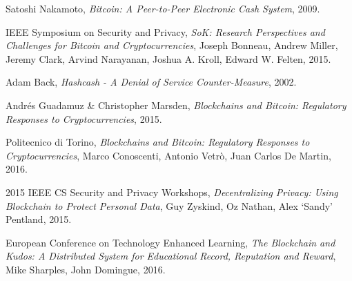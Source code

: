 %
%
%
\begin{thebibliography}{1}

  Satoshi Nakamoto,
  \emph{Bitcoin: A Peer-to-Peer Electronic Cash System},
  2009.



  IEEE Symposium on Security and Privacy,
  \emph{SoK: Research Perspectives and Challenges for Bitcoin and
Cryptocurrencies},
  Joseph Bonneau, Andrew Miller, Jeremy Clark, Arvind Narayanan, Joshua
A. Kroll, Edward W. Felten,
  2015.



  Adam Back,
  \emph{Hashcash - A Denial of Service Counter-Measure},
  2002.

  Andrés Guadamuz \& Christopher Marsden,
  \emph{Blockchains and Bitcoin: Regulatory Responses to Cryptocurrencies},
  2015.

  Politecnico di Torino,
  \emph{Blockchains and Bitcoin: Regulatory Responses to Cryptocurrencies},
  Marco Conoscenti, Antonio Vetrò, Juan Carlos De Martin,
  2016.

  2015 IEEE CS Security and Privacy Workshops,
  \emph{Decentralizing Privacy: Using Blockchain to Protect Personal Data},
  Guy Zyskind, Oz Nathan, Alex `Sandy' Pentland,
  2015.

  European Conference on Technology Enhanced Learning,
  \emph{The Blockchain and Kudos: A Distributed System for Educational Record,
Reputation and Reward},
  Mike Sharples, John Domingue,
  2016.

\end{thebibliography}
